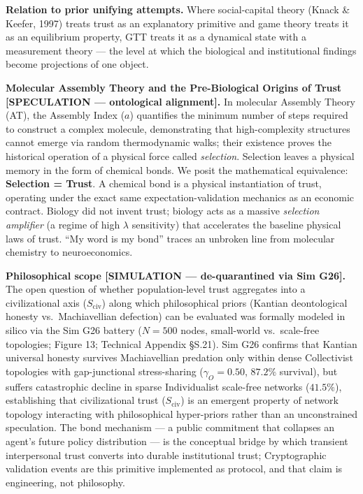 \documentclass[
]{article}
\begin{document}
\textbf{Relation to prior unifying attempts.} Where social-capital
theory (Knack \& Keefer, 1997) treats trust as an explanatory primitive
and game theory treats it as an equilibrium property, GTT treats it as a
dynamical state with a measurement theory --- the level at which the
biological and institutional findings become projections of one object.

\textbf{Molecular Assembly Theory and the Pre-Biological Origins of
Trust {[}SPECULATION --- ontological alignment{]}.} In molecular
Assembly Theory (AT), the Assembly Index (\(a\)) quantifies the minimum
number of steps required to construct a complex molecule, demonstrating
that high-complexity structures cannot emerge via random thermodynamic
walks; their existence proves the historical operation of a physical
force called \emph{selection}. Selection leaves a physical memory in the
form of chemical bonds. We posit the mathematical equivalence:
\textbf{Selection = Trust}. A chemical bond is a physical instantiation
of trust, operating under the exact same expectation-validation
mechanics as an economic contract. Biology did not invent trust; biology
acts as a massive \emph{selection amplifier} (a regime of high
\(\lambda\) sensitivity) that accelerates the baseline physical laws of
trust. ``My word is my bond'' traces an unbroken line from molecular
chemistry to neuroeconomics.

\textbf{Philosophical scope {[}SIMULATION --- de-quarantined via Sim
G26{]}.} The open question of whether population-level trust aggregates
into a civilizational axis (\(S_{\text{civ}}\)) along which
philosophical priors (Kantian deontological honesty vs.~Machiavellian
defection) can be evaluated was formally modeled in silico via the Sim
G26 battery (\(N = 500\) nodes, small-world vs.~scale-free topologies;
Figure 13; Technical Appendix §S.21). Sim G26 confirms that Kantian
universal honesty survives Machiavellian predation only within dense
Collectivist topologies with gap-junctional stress-sharing
(\(\gamma_O = 0.50\), \(87.2\%\) survival), but suffers catastrophic
decline in sparse Individualist scale-free networks (\(41.5\%\)),
establishing that civilizational trust (\(S_{\text{civ}}\)) is an
emergent property of network topology interacting with philosophical
hyper-priors rather than an unconstrained speculation. The bond
mechanism --- a public commitment that collapses an agent's future
policy distribution --- is the conceptual bridge by which transient
interpersonal trust converts into durable institutional trust;
Cryptographic validation events are this primitive implemented as
protocol, and that claim is engineering, not philosophy.
\end{document}
